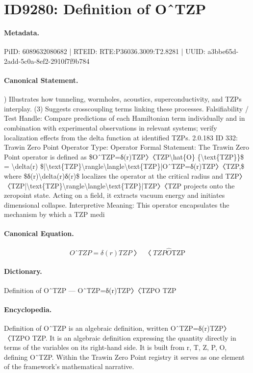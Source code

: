 \section*{ID9280: Definition of OˆTZP}
\paragraph{Metadata.}
PiID: 6089632080682 | RTEID: RTE:P36036.3009:T2.8281 | UUID: a3bbe65d-2add-5c0a-8ef2-2910f7f9b784

\paragraph{Canonical Statement.}
) Illustrates how tunneling, wormholes, acoustics, superconductivity, and TZPs interplay. (3) Suggests crosscoupling terms linking these processes. Falsifiability / Test Handle: Compare predictions of each Hamiltonian term individually and in combination with experimental observations in relevant systems; verify localization effects from the delta function at identified TZPs. 2.0.183 ID 332: Trawin Zero Point Operator Type: Operator Formal Statement: The Trawin Zero Point operator is defined as \$OˆTZP=δ(r)TZP〉〈TZP\textbackslash{}hat\{O\} \{\textbackslash{}text\{TZP\}\}\$ = \textbackslash{}delta(r) \$|\textbackslash{}text\{TZP\}\textbackslash{}rangle\textbackslash{}langle\textbackslash{}text\{TZP\}|OˆTZP=δ(r)TZP〉〈TZP,\$ where \$δ(r)\textbackslash{}delta(r)δ(r)\$ localizes the operator at the critical radius and TZP〉〈TZP|\textbackslash{}text\{TZP\}\textbackslash{}rangle\textbackslash{}langle\textbackslash{}text\{TZP\}|TZP〉〈TZP projects onto the zeropoint state. Acting on a field, it extracts vacuum energy and initiates dimensional collapse. Interpretive Meaning: This operator encapsulates the mechanism by which a TZP medi

\paragraph{Canonical Equation.}
\[
OˆTZP=δ(r)TZP〉〈TZP\hat{O} {\text{TZP}}
\]

\paragraph{Dictionary.}
Definition of OˆTZP — OˆTZP=δ(r)TZP〉〈TZPO TZP

\paragraph{Encyclopedia.}
Definition of OˆTZP is an algebraic definition, written OˆTZP=δ(r)TZP〉〈TZPO TZP. It is an algebraic definition expressing the quantity directly in terms of the variables on its right-hand side. It is built from r, T, Z, P, O, defining OˆTZP. Within the Trawin Zero Point registry it serves as one element of the framework's mathematical narrative.
